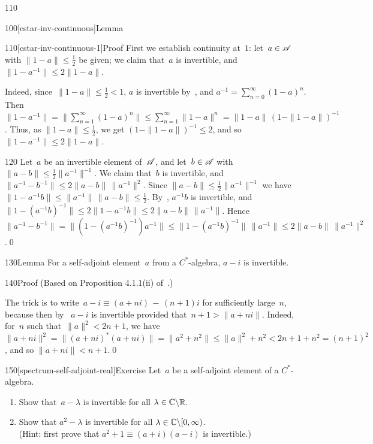 \begin{parsec}{110}
\begin{point}{100}[cstar-inv-continuous]{Lemma}
\begin{point}{110}[cstar-inv-continuous-1]{Proof}
First we establish continuity at~$1$:
let~$a\in\mathscr{A}$ with $\|1-a\|\leq \frac{1}{2}$ be given;
we claim that~$a$ is invertible,
and~$\|1-a^{-1}\| \leq 2\|1-a\|$.

Indeed, since~$\|1-a\|\leq \frac{1}{2}<1$,
$a$ is invertible by~,
and $a^{-1}=\sum_{n=0}^\infty (1-a)^n$.
Then~$\|1-a^{-1}\|=\|\sum_{n=1}^\infty (1-a)^n\|\leq \sum_{n=1}^\infty \|1-a\|^n
= \|1-a\|\, (1-\|1-a\|)^{-1}$.
Thus, as $\|1-a\|\leq\frac{1}{2}$,
we get $(1-\|1-a\|)^{-1}\leq 2$,
and so $\|1-a^{-1}\|\leq 2\|1-a\|$.
\begin{point}{120}%
Let~$a$ be an invertible element of~$\mathscr{A}$,
and let~$b\in\mathscr{A}$ with~$\|a-b\|\leq\frac{1}{2}\|a^{-1}\|^{-1}$.
We claim that~$b$ is invertible,
and~$\|a^{-1}-b^{-1}\|\leq 2\|a-b\|\,\|a^{-1}\|^2$.
Since $\|a-b\|\leq \frac{1}{2}\|a^{-1}\|^{-1}$
we have
$\|1-a^{-1}b\|\leq \|a^{-1}\|\,\|a-b\|\leq \frac{1}{2}$.
By~, $a^{-1}b$ is invertible,
and $\|1-(a^{-1}b)^{-1}\|\leq 2\|1-a^{-1}b\|\leq 2\|a-b\|\,\|a^{-1}\|$.
Hence $\|a^{-1}-b^{-1}\| = \|(1-(a^{-1}b)^{-1})a^{-1}\|
\leq \|1-(a^{-1}b)^{-1}\|\,\|a^{-1}\|\leq 2 \|a-b\|\,\|a^{-1}\|^2$.\qed
\end{point}
\end{point}
\end{point}
%
%
\begin{point}{130}{Lemma}%
For a self-adjoint element~$a$ from a $C^*$-algebra,
$a-i$ is invertible.
\begin{point}{140}{Proof}%
(Based on Proposition 4.1.1(ii) of~\cite{kr}.)

The trick
is to 
write~$a-i\equiv (a+ni)\,-\,(n+1)i$
for sufficiently large~$n$,
because  
then
by~
$a-i$
is invertible provided that~$n+1 > \|a+ni\|$.
Indeed, for~$n$ such that~$\|a\|^2<2n+1$,
we have $\|a+ni\|^2 = \|(a+ni)^*(a+ni)\|
= \|a^2+n^2\|
\leq \|a\|^2+n^2 < 2n+1+n^2 = (n+1)^2$,
and so $\|a+ni\| < n+1$.\qed
\end{point}
\end{point}
\begin{point}{150}[spectrum-self-adjoint-real]{Exercise}%
Let~$a$ be a self-adjoint element of a $C^*$-algebra.
\begin{enumerate}
\item
Show that~$a-\lambda$ is invertible for all $\lambda\in \mathbb{C}\backslash \mathbb{R}$.
\item
Show that $a^2-\lambda$ is invertible for all 
$\lambda\in \mathbb{C}\backslash[0,\infty)$.\\
(Hint: first prove that
 $a^2+1 \equiv (a+i)(a-i)$ is invertible.)


\end{enumerate}
\end{point}
\end{parsec}
